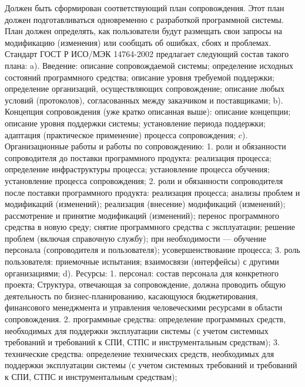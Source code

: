 \documentclass{../industrial-development}
\begin{document}
\lecturenotes
Должен быть сформирован соответствующий план сопровождения. Этот план должен подготавливаться одновременно с разработкой программной системы. План должен определять, как пользователи будут размещать свои запросы на модификацию (изменения) или сообщать об ошибках, сбоях и проблемах.
Стандарт ГОСТ Р ИСО/МЭК 14764-2002 предлагает следующий состав такого плана:
a). Введение:
    описание сопровождаемой системы;
    определение исходных состояний программного средства;
    описание уровня требуемой поддержки;
    определение организаций, осуществляющих сопровождение;
    описание любых условий (протоколов), согласованных между заказчиком и поставщиками;
b). Концепция сопровождения (уже кратко описанная выше):
    описание концепции;
    описание уровня поддержки системы;
    установление периода поддержки;
    адаптация (практическое применение) процесса сопровождения;
c). Организационные работы и работы по сопровождению:
      1. роли и обязанности сопроводителя до поставки программного продукта:
            реализация процесса;
            определение инфраструктуры процесса;
            установление процесса обучения;
            установление процесса сопровождения;
     2. роли и обязанности сопроводителя после поставки программного продукта:
            реализация процесса;
            анализы проблем и модификаций (изменений);
            реализация (внесение) модификаций (изменений);
            рассмотрение и принятие модификаций (изменений);
            перенос программного средства в новую среду;
            снятие программного средства с эксплуатации;
            решение проблем (включая справочную службу);
            при необходимости — обучение персонала (сопроводителя и пользователя);
            усовершенствование процесса;
      3. роль пользователя:
        приемочные испытания;
        взаимосвязи (интерфейсы) с другими организациями;
d). Ресурсы:
      1. персонал:
        состав персонала для конкретного проекта; Структура, отвечающая за сопровождение, должна проводить общую деятельность по бизнес-планированию, касающуюся бюджетирования, финансового менеджмента и управления человеческими ресурсами в области сопровождения.
      2. программные средства:
        определение программных средств, необходимых для поддержки эксплуатации системы (с учетом системных требований и требований к СПИ, СТПС и инструментальным средствам);
      3. технические средства:
        определение технических средств, необходимых для поддержки эксплуатации системы (с учетом системных требований и требований к СПИ, СТПС и инструментальным средствам);
\end{document}
